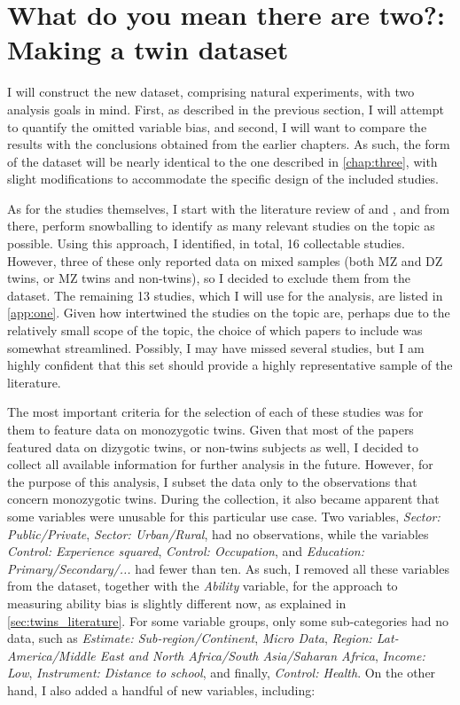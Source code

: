 \section{What do you mean there are two?: Making a twin dataset}
\label{sec:twins_data}

I will construct the new dataset, comprising natural experiments, with two analysis goals in mind. First, as described in the previous section, I will attempt to quantify the omitted variable bias, and second, I will want to compare the results with the conclusions obtained from the earlier chapters. As such, the form of the dataset will be nearly identical to the one described in \autoref{chap:three}, with slight modifications to accommodate the specific design of the included studies.

As for the studies themselves, I start with the literature review of \cite{nakamuro2012estimating} and \cite{li2012estimating}, and from there, perform snowballing to identify as many relevant studies on the topic as possible. Using this approach, I identified, in total, 16 collectable studies. However, three of these only reported data on mixed samples (both MZ and DZ twins, or MZ twins and non-twins), so I decided to exclude them from the dataset. The remaining 13 studies, which I will use for the analysis, are listed in \autoref{app:one}. Given how intertwined the studies on the topic are, perhaps due to the relatively small scope of the topic, the choice of which papers to include was somewhat streamlined. Possibly, I may have missed several studies, but I am highly confident that this set should provide a highly representative sample of the literature.

The most important criteria for the selection of each of these studies was for them to feature data on monozygotic twins. Given that most of the papers featured data on dizygotic twins, or non-twins subjects as well, I decided to collect all available information for further analysis in the future. However, for the purpose of this analysis, I subset the data only to the observations that concern monozygotic twins. During the collection, it also became apparent that some variables were unusable for this particular use case. Two variables, \textit{Sector: Public/Private}, \textit{Sector: Urban/Rural}, had no observations, while the variables \textit{Control: Experience squared}, \textit{Control: Occupation}, and \textit{Education: Primary/Secondary/...} had fewer than ten. As such, I removed all these variables from the dataset, together with the \textit{Ability} variable, for the approach to measuring ability bias is slightly different now, as explained in \autoref{sec:twins_literature}. For some variable groups, only some sub-categories had no data, such as \textit{Estimate: Sub-region/Continent}, \textit{Micro Data}, \textit{Region: Lat-America/Middle East and North Africa/South Asia/Saharan Africa}, \textit{Income: Low}, \textit{Instrument: Distance to school}, and finally, \textit{Control: Health}. On the other hand, I also added a handful of new variables, including:

